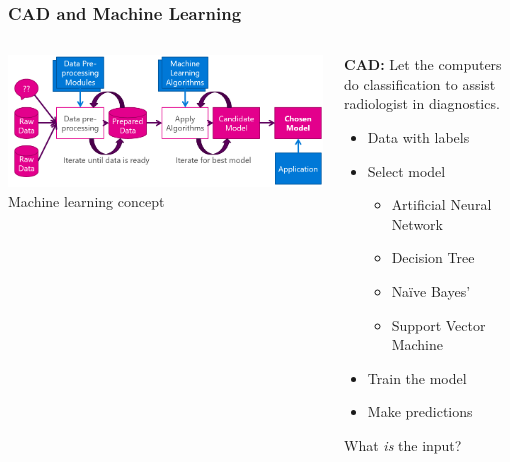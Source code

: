 \documentclass[aspectratio=1610]{beamer}
\begin{document}
\begin{frame}
  \frametitle{\hfill CAD and Machine Learning}
  \begin{columns}[T]
    \begin{column}{.5\textwidth}
      \begin{block}{}
        \includegraphics[width=\textwidth]{images/MLprocess.PNG}\\
        Machine learning concept
      \end{block}
    \end{column}
    \begin{column}{.5\textwidth}
      \begin{block}{}
        \textbf{CAD:} Let the computers do classification to assist radiologist in diagnostics.\pause
        \begin{itemize}
          \item Data with labels\pause
          \item Select model
          \begin{itemize}
            \item Artificial Neural Network
            \item Decision Tree
            \item Na\"ive Bayes'
            \item Support Vector Machine\pause
          \end{itemize}
          \item Train the model\pause
          \item Make predictions\pause
        \end{itemize}
        \vspace{0.02\textheight}
        What \textit{is} the input?
      \end{block}
    \end{column}
  \end{columns}
\end{frame}
\end{document}

